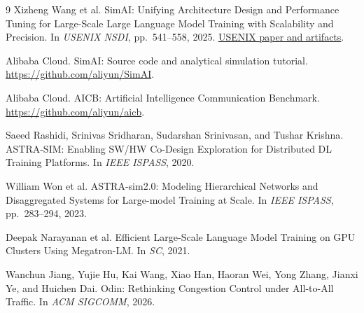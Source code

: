 \documentclass[letterpaper,twocolumn,10pt]{article}
\begin{document}
\begin{thebibliography}{9}
Xizheng Wang et al.
\newblock SimAI: Unifying Architecture Design and Performance Tuning for Large-Scale Large Language Model Training with Scalability and Precision.
\newblock In \emph{USENIX NSDI}, pp.~541--558, 2025.
\newblock \href{https://www.usenix.org/conference/nsdi25/presentation/wang-xizheng-simai}{USENIX paper and artifacts}.

Alibaba Cloud.
\newblock SimAI: Source code and analytical simulation tutorial.
\newblock \url{https://github.com/aliyun/SimAI}.

Alibaba Cloud.
\newblock AICB: Artificial Intelligence Communication Benchmark.
\newblock \url{https://github.com/aliyun/aicb}.

Saeed Rashidi, Srinivas Sridharan, Sudarshan Srinivasan, and Tushar Krishna.
\newblock ASTRA-SIM: Enabling SW/HW Co-Design Exploration for Distributed DL Training Platforms.
\newblock In \emph{IEEE ISPASS}, 2020.

William Won et al.
\newblock ASTRA-sim2.0: Modeling Hierarchical Networks and Disaggregated Systems for Large-model Training at Scale.
\newblock In \emph{IEEE ISPASS}, pp.~283--294, 2023.

Deepak Narayanan et al.
\newblock Efficient Large-Scale Language Model Training on GPU Clusters Using Megatron-LM.
\newblock In \emph{SC}, 2021.

Wanchun Jiang, Yujie Hu, Kai Wang, Xiao Han, Haoran Wei, Yong Zhang, Jianxi Ye, and Huichen Dai.
\newblock Odin: Rethinking Congestion Control under All-to-All Traffic.
\newblock In \emph{ACM SIGCOMM}, 2026.
\end{thebibliography}
\end{document}
